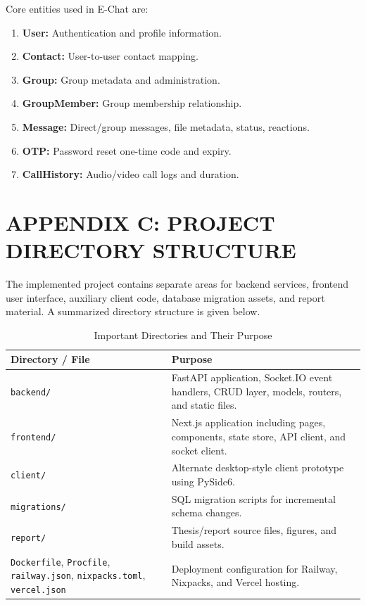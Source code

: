 \documentclass[12pt,a4paper,oneside]{report}
\begin{document}
Core entities used in E-Chat are:
\begin{enumerate}
  \item \textbf{User:} Authentication and profile information.
  \item \textbf{Contact:} User-to-user contact mapping.
  \item \textbf{Group:} Group metadata and administration.
  \item \textbf{GroupMember:} Group membership relationship.
  \item \textbf{Message:} Direct/group messages, file metadata, status, reactions.
  \item \textbf{OTP:} Password reset one-time code and expiry.
  \item \textbf{CallHistory:} Audio/video call logs and duration.
\end{enumerate}

\cleardoublepage

\chapter*{APPENDIX C: PROJECT DIRECTORY STRUCTURE}
{}
\label{front:appendix-c}
\thispagestyle{plain}

The implemented project contains separate areas for backend services, frontend
user interface, auxiliary client code, database migration assets, and report
material. A summarized directory structure is given below.

\begin{table}[H]
\centering
\caption{Important Directories and Their Purpose}
\begin{tabularx}{\textwidth}{|L{4.2cm}|X|}
\hline
\textbf{Directory / File} & \textbf{Purpose} \\
\hline
\texttt{backend/} & FastAPI application, Socket.IO event handlers, CRUD layer, models, routers, and static files. \\
\hline
\texttt{frontend/} & Next.js application including pages, components, state store, API client, and socket client. \\
\hline
\texttt{client/} & Alternate desktop-style client prototype using PySide6. \\
\hline
\texttt{migrations/} & SQL migration scripts for incremental schema changes. \\
\hline
\texttt{report/} & Thesis/report source files, figures, and build assets. \\
\hline
\texttt{Dockerfile}, \texttt{Procfile}, \texttt{railway.json}, \texttt{nixpacks.toml}, \texttt{vercel.json} & Deployment configuration for Railway, Nixpacks, and Vercel hosting. \\
\hline
\end{tabularx}
\end{table}
\end{document}
